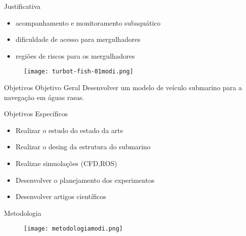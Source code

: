 \begin{frame}[c]{Justificativa}
    \begin{itemize}
        \item acompanhamento e monitoramento subaquático
        \item dificuldade de acesso para mergulhadores
        \item regiões de riscos para os mergulhadores
    \end{itemize}

    \begin{figure}
        \texttt{[image: turbot-fish-01modi.png]}
    \end{figure}
\end{frame}
\begin{frame}[t]{Objetivos}
    Objetivo Geral
    \newline
    Desenvolver um modelo de veículo submarino para a navegação em águas rasas.
    \newline

    Objetivos Específicos
    \begin{itemize}
        \item Realizar o estudo do estado da arte
        \item Realizar o desing da estrutura do submarino
        \item Realizae simuolações (CFD,ROS)
        \item Desenvolver o planejamento dos experimentos
        \item Desenvolver artigos científicos
    \end{itemize}
   

\end{frame}
\begin{frame}[c]{Metodologia }
        \begin{figure}
        \texttt{[image: metodologiamodi.png]}
    \end{figure}
\end{frame}
